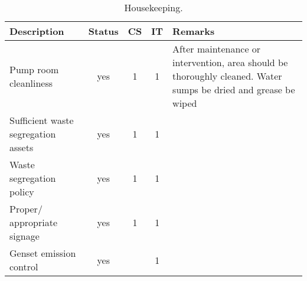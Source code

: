 \begin{table}
	\caption{Housekeeping.}
	\label{ch047_tbl_housekeeping}
	{\footnotesize

\begin{tabular}{p{4cm}|c|c|c|p{6cm}}
\hline
Description & Status & CS & IT & Remarks \\ 
\hline
Pump room cleanliness & yes & 1 & 1 & After maintenance or intervention, area should be thoroughly cleaned. Water sumps be dried and grease be wiped \\ 
Sufficient waste segregation assets & yes & 1 & 1 &  \\ 
Waste segregation policy & yes & 1 & 1 &  \\ 
Proper/ appropriate signage & yes & 1 & 1 &  \\ 
Genset emission control & yes &  & 1 &  \\ 

\hline
\end{tabular}
	}
\end{table}
